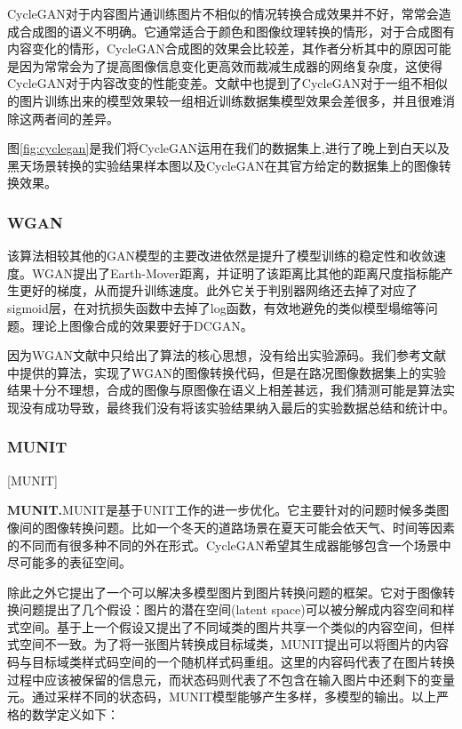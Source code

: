 CycleGAN对于内容图片通训练图片不相似的情况转换合成效果并不好，常常会造成合成图的语义不明确。它通常适合于颜色和图像纹理转换的情形，对于合成图有内容变化的情形，CycleGAN合成图的效果会比较差，其作者分析其中的原因可能是因为常常会为了提高图像信息变化更高效而裁减生成器的网络复杂度，这使得CycleGAN对于内容改变的性能变差。文献\cite{CycleGAN}中也提到了CycleGAN对于一组不相似的图片训练出来的模型效果较一组相近训练数据集模型效果会差很多，并且很难消除这两者间的差异。

图\ref{fig:cyclegan}是我们将CycleGAN运用在我们的数据集上,进行了晚上到白天以及黑天场景转换的实验结果样本图以及CycleGAN在其官方给定的数据集上的图像转换效果。 


\subsubsection{WGAN}

 该算法相较其他的GAN模型的主要改进依然是提升了模型训练的稳定性和收敛速度。WGAN提出了Earth-Mover距离，并证明了该距离比其他的距离尺度指标能产生更好的梯度，从而提升训练速度。此外它关于判别器网络还去掉了对应了sigmoid层，在对抗损失函数中去掉了log函数，有效地避免的类似模型塌缩等问题。理论上图像合成的效果要好于DCGAN。

因为WGAN文献中只给出了算法的核心思想，没有给出实验源码。我们参考文献中提供的算法，实现了WGAN的图像转换代码，但是在路况图像数据集上的实验结果十分不理想，合成的图像与原图像在语义上相差甚远，我们猜测可能是算法实现没有成功导致，最终我们没有将该实验结果纳入最后的实验数据总结和统计中。

\subsubsection{MUNIT}[MUNIT]

\textbf{MUNIT.}\cite{MUNIT}\quad MUNIT是基于UNIT\cite{UNIT}工作的进一步优化。它主要针对的问题时候多类图像间的图像转换问题。比如一个冬天的道路场景在夏天可能会依天气、时间等因素的不同而有很多种不同的外在形式。CycleGAN希望其生成器能够包含一个场景中尽可能多的表征空间。

除此之外它提出了一个可以解决多模型图片到图片转换问题的框架。它对于图像转换问题提出了几个假设：图片的潜在空间(latent space)可以被分解成内容空间和样式空间。基于上一个假设又提出了不同域类的图片共享一个类似的内容空间，但样式空间不一致。为了将一张图片转换成目标域类，MUNIT提出可以将图片的内容码与目标域类样式码空间的一个随机样式码重组。这里的内容码代表了在图片转换过程中应该被保留的信息元，而状态码则代表了不包含在输入图片中还剩下的变量元。通过采样不同的状态码，MUNIT模型能够产生多样，多模型的输出。以上严格的数学定义如下：

